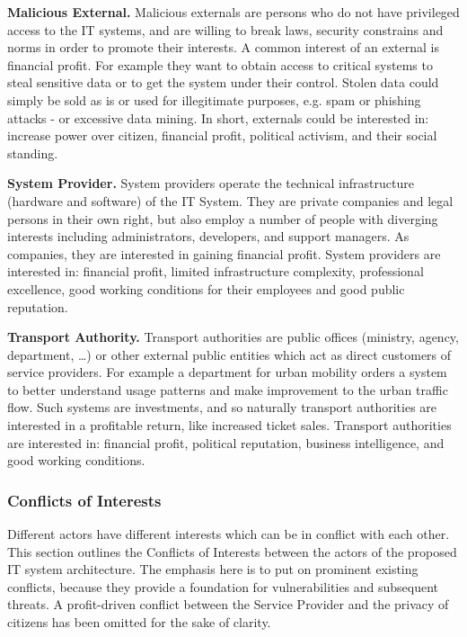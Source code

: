 \documentclass[runningheads,a4paper]{llncs}
\begin{document}
\textbf{Malicious External.}
Malicious externals are persons who do not have privileged access to the IT systems, and are willing to break laws, security constrains and norms in order to promote their interests. A common interest of an external is financial profit. For example they want to obtain access to critical systems to steal sensitive data or to get the system under their control. Stolen data could simply be sold as is or used for illegitimate purposes, e.g. spam or phishing attacks - or excessive data mining. In short, externals could be interested in: increase power over citizen, financial profit, political activism, and their social standing.

\textbf{System Provider.}
System providers operate the technical infrastructure (hardware and software) of the IT System. They are private companies and legal persons in their own right, but also employ a number of people with diverging interests including administrators, developers, and support managers. As companies, they are interested in gaining financial profit. 
System providers are interested in: financial profit, limited infrastructure complexity, professional excellence, good working conditions for their employees and good public reputation.

\textbf{Transport Authority.}
Transport authorities are public offices (ministry, agency, department, \dots) or other external public entities which act as direct customers of service providers. For example a department for urban mobility orders a system to better understand usage patterns and make improvement to the urban traffic flow. Such systems are investments, and so naturally transport authorities are interested in a profitable return, like increased ticket sales. Transport authorities are interested in: financial profit, political reputation, business intelligence, and good working conditions.


\subsubsection{Conflicts of Interests}
\label{subsubsection:Conflicts of Interests}
Different actors have different interests which can be in conflict with each other. This section outlines the Conflicts of Interests between the actors of the proposed IT system architecture. The emphasis here is to put on prominent existing conflicts, because they provide a foundation for vulnerabilities and subsequent threats. A profit-driven conflict between the Service Provider and the privacy of citizens has been omitted for the sake of clarity.
\end{document}
